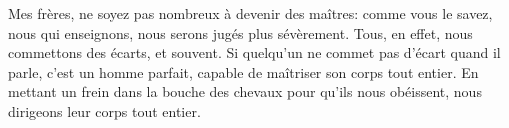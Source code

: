 Mes frères, ne soyez pas nombreux à devenir des maîtres:
	comme vous le savez, nous qui enseignons,
	nous serons jugés plus sévèrement.
Tous, en effet, nous commettons des écarts, et souvent.
Si quelqu’un ne commet pas d’écart quand il parle,
	c’est un homme parfait, capable de maîtriser son corps tout entier.
En mettant un frein dans la bouche des chevaux pour qu’ils nous obéissent,
	nous dirigeons leur corps tout entier.
